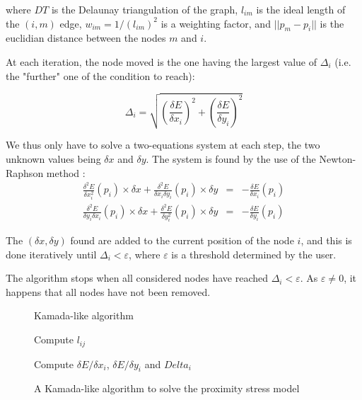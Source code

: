 \documentclass[12pt]{report}
\begin{document}
where $DT$ is the Delaunay triangulation of the graph, $l_{im}$ is the ideal length of the $(i,m)$ edge, $w_{im} = 1/(l_{im})^2 $ is a weighting factor, and $||p_m - p_i||$ is the euclidian distance between the nodes $m$ and $i$.

At each iteration, the node moved is the one having the largest value of $\Delta_i$ (i.e. the "further" one of the condition to reach):

\[\Delta_i = \sqrt{\left(\frac{\delta E}{\delta x_i}\right)^2 + \left(\frac{\delta E}{\delta y_i}\right)^2} \]

\bigskip
We thus only have to solve a two-equations system at each step, the two unknown values being $\delta x$ and $\delta y$. The system is found by the use of the Newton-Raphson method :
\begin{eqnarray}
\label{eq1}
\frac{\delta^2 E}{\delta x_i^2}(p_i) \times \delta x +  \frac{\delta^2 E}{\delta x_i \delta y_i}(p_i) \times \delta y  & = & - \frac{\delta E}{\delta x_i} (p_i) \\
\frac{\delta^2 E}{\delta y_i \delta x_i}(p_i) \times \delta x +  \frac{\delta^2 E}{\delta y_i^2}(p_i) \times \delta y & = & - \frac{\delta E}{\delta y_i} (p_i)
\label{eq2}
\end{eqnarray}

The $(\delta x, \delta y)$ found are added to the current position of the node $i$, and this is done iteratively until $\Delta_i < \varepsilon$, where $\varepsilon$ is a threshold determined by the user.

The algorithm stops when all considered nodes have reached $\Delta_i < \varepsilon$. As $\varepsilon \neq 0$, it happens that all nodes have not been removed.

\begin{figure}
\begin{algorithm}[H]
\caption{Kamada-like algorithm}
{Compute $l_{ij}$}

{Compute $\delta E / \delta x_i$, $\delta E / \delta y_i$ and $Delta_i$}


\end{algorithm}
\caption{A Kamada-like algorithm to solve the proximity stress model}
\label{algkamada}
\end{figure}
\end{document}
